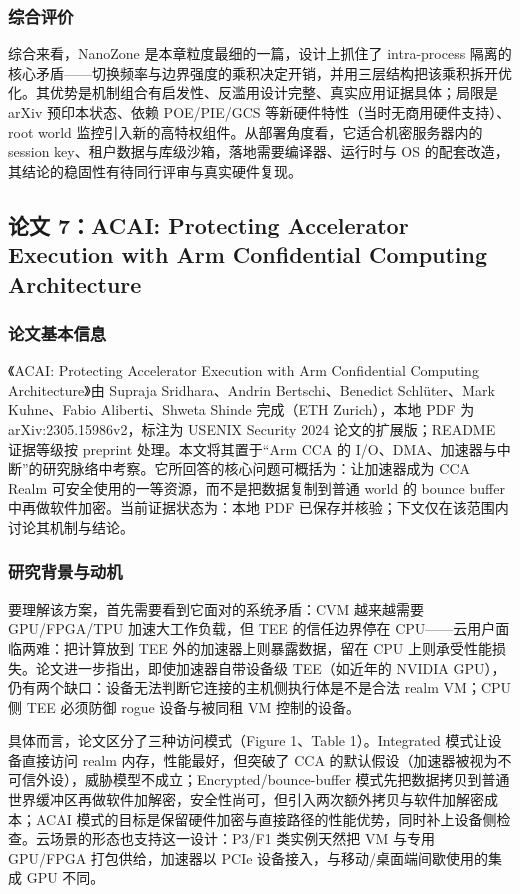 \documentclass[11pt]{ctexart}
\begin{document}
\subsubsection{综合评价}
综合来看，NanoZone 是本章粒度最细的一篇，设计上抓住了 intra-process 隔离的核心矛盾——切换频率与边界强度的乘积决定开销，并用三层结构把该乘积拆开优化。其优势是机制组合有启发性、反滥用设计完整、真实应用证据具体；局限是 arXiv 预印本状态、依赖 POE/PIE/GCS 等新硬件特性（当时无商用硬件支持）、root world 监控引入新的高特权组件。从部署角度看，它适合机密服务器内的 session key、租户数据与库级沙箱，落地需要编译器、运行时与 OS 的配套改造，其结论的稳固性有待同行评审与真实硬件复现。\par

\subsection{论文 7：ACAI: Protecting Accelerator Execution with Arm Confidential Computing Architecture}
\subsubsection{论文基本信息}
《ACAI: Protecting Accelerator Execution with Arm Confidential Computing Architecture》由 Supraja Sridhara、Andrin Bertschi、Benedict Schlüter、Mark Kuhne、Fabio Aliberti、Shweta Shinde 完成（ETH Zurich），本地 PDF 为 arXiv:2305.15986v2，标注为 USENIX Security 2024 论文的扩展版；README 证据等级按 preprint 处理。本文将其置于“Arm CCA 的 I/O、DMA、加速器与中断”的研究脉络中考察。它所回答的核心问题可概括为：让加速器成为 CCA Realm 可安全使用的一等资源，而不是把数据复制到普通 world 的 bounce buffer 中再做软件加密。当前证据状态为：本地 PDF 已保存并核验；下文仅在该范围内讨论其机制与结论。\cite{acai2023}\par
\subsubsection{研究背景与动机}
要理解该方案，首先需要看到它面对的系统矛盾：CVM 越来越需要 GPU/FPGA/TPU 加速大工作负载，但 TEE 的信任边界停在 CPU——云用户面临两难：把计算放到 TEE 外的加速器上则暴露数据，留在 CPU 上则承受性能损失。论文进一步指出，即使加速器自带设备级 TEE（如近年的 NVIDIA GPU），仍有两个缺口：设备无法判断它连接的主机侧执行体是不是合法 realm VM；CPU 侧 TEE 必须防御 rogue 设备与被同租 VM 控制的设备。\par
具体而言，论文区分了三种访问模式（Figure 1、Table 1）。Integrated 模式让设备直接访问 realm 内存，性能最好，但突破了 CCA 的默认假设（加速器被视为不可信外设），威胁模型不成立；Encrypted/bounce-buffer 模式先把数据拷贝到普通世界缓冲区再做软件加解密，安全性尚可，但引入两次额外拷贝与软件加解密成本；ACAI 模式的目标是保留硬件加密与直接路径的性能优势，同时补上设备侧检查。云场景的形态也支持这一设计：P3/F1 类实例天然把 VM 与专用 GPU/FPGA 打包供给，加速器以 PCIe 设备接入，与移动/桌面端间歇使用的集成 GPU 不同。\par
\end{document}
